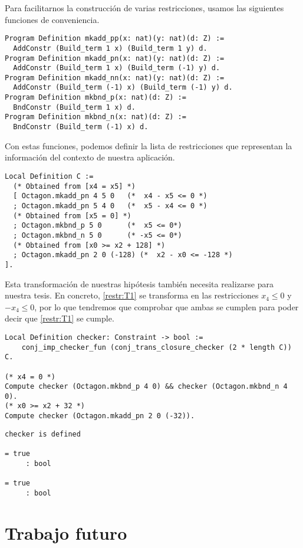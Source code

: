 Para facilitarnos la construcción de varias restricciones, usamos las siguientes
funciones de conveniencia.

\begin{verbatim}
Program Definition mkadd_pp(x: nat)(y: nat)(d: Z) :=
  AddConstr (Build_term 1 x) (Build_term 1 y) d.
Program Definition mkadd_pn(x: nat)(y: nat)(d: Z) :=
  AddConstr (Build_term 1 x) (Build_term (-1) y) d.
Program Definition mkadd_nn(x: nat)(y: nat)(d: Z) :=
  AddConstr (Build_term (-1) x) (Build_term (-1) y) d.
Program Definition mkbnd_p(x: nat)(d: Z) :=
  BndConstr (Build_term 1 x) d.
Program Definition mkbnd_n(x: nat)(d: Z) :=
  BndConstr (Build_term (-1) x) d.
\end{verbatim}

Con estas funciones, podemos definir la lista de restricciones que representan
la información del contexto de nuestra aplicación.

\begin{verbatim}
Local Definition C := 
  (* Obtained from [x4 = x5] *)
  [ Octagon.mkadd_pn 4 5 0   (*  x4 - x5 <= 0 *)
  ; Octagon.mkadd_pn 5 4 0   (*  x5 - x4 <= 0 *)
  (* Obtained from [x5 = 0] *)
  ; Octagon.mkbnd_p 5 0      (*  x5 <= 0*)
  ; Octagon.mkbnd_n 5 0      (* -x5 <= 0*)
  (* Obtained from [x0 >= x2 + 128] *)
  ; Octagon.mkadd_pn 2 0 (-128) (*  x2 - x0 <= -128 *)
].
\end{verbatim}

Esta transformación de nuestras hipótesis también necesita realizarse para
nuestra tesis. En concreto, \ref{restr:T1}  se transforma en las 
restricciones $x_4 \le 0$ y $-x_4 \le 0$,  por lo que tendremos que comprobar 
que ambas se cumplen para poder decir que \ref{restr:T1} se cumple.

\begin{verbatim}
Local Definition checker: Constraint -> bool := 
    conj_imp_checker_fun (conj_trans_closure_checker (2 * length C)) C.

(* x4 = 0 *)
Compute checker (Octagon.mkbnd_p 4 0) && checker (Octagon.mkbnd_n 4 0).
(* x0 >= x2 + 32 *)
Compute checker (Octagon.mkadd_pn 2 0 (-32)).
\end{verbatim}
\vspace{-\baselineskip*3/2}
\begin{verbatim}
checker is defined

= true
     : bool

= true
     : bool
\end{verbatim}

\section{Trabajo futuro}
\label{sect:future-work}

